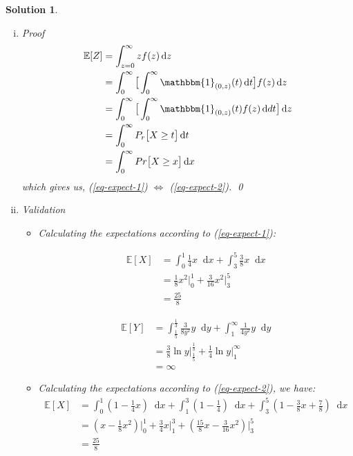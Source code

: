 \documentclass[a4paper,UTF8]{article}
\numberwithin{equation}{section}
\newtheorem*{mySol}{Solution}
\newcommand*\diff{\mathop{}\!\mathrm{d}}
\begin{document}
\begin{mySol}
\begin{enumerate}[{(}1{)}]
\begin{enumerate}[(i)]

\item Proof
\begin{equation*}
\begin{split}
\mathbb{E}[Z]  & = \int_{z=0}^{\infty}zf(z) \diff z \\
 & =\int_0^\infty \big[ \int_0^\infty \mathbbm{1}_{(0,z)}(t) \diff t \big] f(z) \diff z \\
&= \int_0^\infty \big[ \int_0^\infty \mathbbm{1}_{(0,z)}(t)f(z) \diff dt \big]  \diff z \\
&= \int_0^\infty P_r \big[ X\geq t \big] \diff t \\
&= \int_0^\infty Pr \big[ X\geq x \big] \diff x
\end{split} 
\end{equation*}
which gives us, (\ref{eq-expect-1}) $\iff$ (\ref{eq-expect-2}).
\qed
\item Validation\\
\begin{itemize}
\item  Calculating the expectations according to (\ref{eq-expect-1}):

\begin{equation*}
\begin{split}
\mathbb{E}[X]&=\int_0^1 \frac{1}{4}x \diff x + \int_3^5 \frac{3}{8}x \diff x \\
&=\frac{1}{8}x^2\bigg\rvert_0 ^1 + \frac{3}{16}x^2 \biggr\rvert_3^5\\
&=\frac{25}{8}
\end{split}
\end{equation*}

\begin{equation*}
\begin{split}
\mathbb{E}[Y]&=\int_{\frac{1}{5}}^{\frac{1}{3}} \frac{3}{8y^2}y \diff y + \int_1^\infty \frac{1}{4y^2}y \diff y \\
&=\frac{3}{8} \ln y \bigg\rvert_\frac{1}{5} ^\frac{1}{3} + \frac{1}{4}\ln y \biggr\rvert_1^\infty \\
&=\infty
\end{split}
\end{equation*}

\item Calculating the expectations according to (\ref{eq-expect-2}), we have:
\begin{equation*}
\begin{split}
\mathbb{E}[X]&=\int_0^1 (1-\frac{1}{4}x) \diff x +\int_1^3(1-\frac{1}{4}) \diff x + \int_3^5 (1-\frac{3}{8}x+\frac{7}{8}) \diff x \\
&=(x-\frac{1}{8}x^2)\bigg\rvert_0 ^1 + \frac{3}{4}x\biggr\rvert_1^3+(\frac{15}{8}x-\frac{3}{16}x^2) \biggr\rvert_3^5\\
&=\frac{25}{8}
\end{split}
\end{equation*}


\end{itemize}
\end{enumerate}
\end{enumerate}
\end{mySol}
\end{document}
